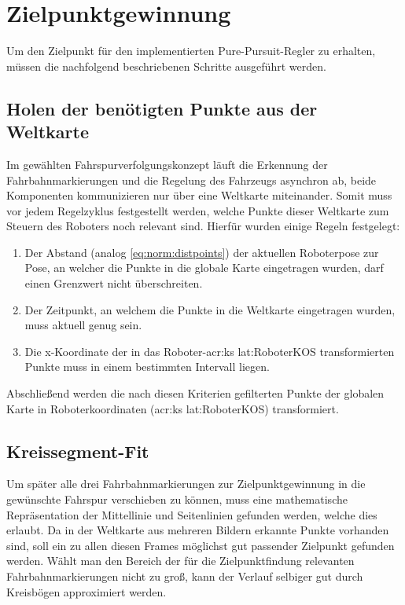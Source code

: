 \section{Zielpunktgewinnung}
Um den Zielpunkt für den implementierten \glqq Pure-Pursuit\grqq -Regler zu erhalten, müssen die nachfolgend beschriebenen Schritte ausgeführt werden.

\subsection{Holen der benötigten Punkte aus der Weltkarte}
Im gewählten Fahrspurverfolgungskonzept läuft die Erkennung der Fahrbahnmarkierungen und die Regelung des Fahrzeugs asynchron ab, beide Komponenten kommunizieren nur über eine Weltkarte miteinander. Somit muss vor jedem Regelzyklus festgestellt werden, welche Punkte dieser Weltkarte zum Steuern des Roboters noch relevant sind. Hierfür wurden einige Regeln festgelegt:
\begin{enumerate}
\item 
Der Abstand (analog \ref{eq:norm:distpoints}) der aktuellen Roboterpose zur Pose, an welcher die Punkte in die globale Karte eingetragen wurden, darf einen Grenzwert nicht überschreiten.
\item
Der Zeitpunkt, an welchem die Punkte in die Weltkarte eingetragen wurden, muss aktuell genug sein.
\item
Die x-Koordinate der in das Roboter-\gls{acr:ks} \gls{lat:RoboterKOS} transformierten Punkte muss in einem bestimmten Intervall liegen.
\end{enumerate}
Abschließend werden die nach diesen Kriterien gefilterten Punkte der globalen Karte in Roboterkoordinaten (\gls{acr:ks} \gls{lat:RoboterKOS}) transformiert.

\subsection{Kreissegment-Fit} \label{regelung:zielpunkt:kreissegment-fit}
Um später alle drei Fahrbahnmarkierungen zur Zielpunktgewinnung in die gewünschte Fahrspur verschieben zu können, muss eine mathematische Repräsentation der Mittellinie und Seitenlinien gefunden werden, welche dies erlaubt. Da in der Weltkarte aus mehreren Bildern erkannte Punkte vorhanden sind, soll ein zu allen diesen Frames möglichst gut passender Zielpunkt gefunden werden. Wählt man den Bereich der für die Zielpunktfindung relevanten Fahrbahnmarkierungen nicht zu groß, kann der Verlauf selbiger gut durch Kreisbögen approximiert werden. 

